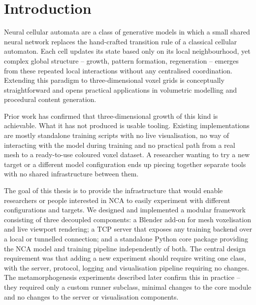
% 

\chapter{Introduction}

Neural cellular automata are a class of generative models in which a small shared
neural network replaces the hand-crafted transition rule of a classical cellular
automaton. Each cell updates its state based only on its local neighbourhood, yet
complex global structure -- growth, pattern formation, regeneration -- emerges from
these repeated local interactions without any centralised coordination. Extending this
paradigm to three-dimensional voxel grids is conceptually straightforward and opens
practical applications in volumetric modelling and procedural content generation.

Prior work has confirmed that three-dimensional growth of this kind is achievable.
What it has not produced is usable tooling. Existing implementations are mostly 
standalone training scripts with no live visualisation, no way of interacting 
with the model during training and no practical path from a real mesh to a ready-to-use 
coloured voxel dataset. A researcher wanting to try a new target or a different model 
configuration ends up piecing together separate tools with no shared infrastructure 
between them.

The goal of this thesis is to provide the infrastructure that would enable researchers
or people interested in NCA to easily experiment with different configurations and targets. 
We designed and implemented a modular framework consisting of three decoupled 
components: a Blender add-on for mesh voxelisation and live viewport rendering; a TCP 
server that exposes any training
backend over a local or tunnelled connection; and a standalone Python core package
providing the NCA model and training pipeline independently of both. The central
design requirement was that adding a new experiment should require writing one class,
with the server, protocol, logging and visualisation pipeline requiring no changes.
The metamorphogenesis experiments described later confirm this in practice -- they
required only a custom runner subclass, minimal changes to the core module and no
changes to the server or visualisation components.


